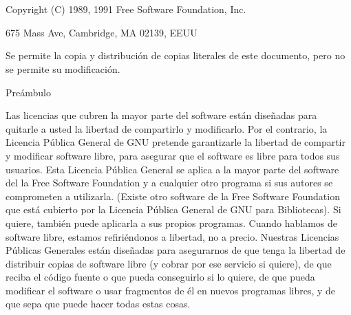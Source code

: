 


\chapter*{}

 \begin{center}

Copyright (C) 1989, 1991 Free Software Foundation, Inc.

675 Mass Ave, Cambridge, MA 02139, EEUU

Se permite la copia y distribución de copias literales de este documento, pero no se permite su modificación.


\end{center}

Preámbulo

Las licencias que cubren la mayor parte del software están diseñadas para quitarle a usted la libertad de compartirlo y modificarlo. Por el contrario, la Licencia Pública General de GNU pretende garantizarle la libertad de compartir y modificar software libre, para asegurar que el software es libre para todos sus usuarios. Esta Licencia Pública General se aplica a la mayor parte del software del la Free Software Foundation y a cualquier otro programa si sus autores se comprometen a utilizarla. (Existe otro software de la Free Software Foundation que está cubierto por la Licencia Pública General de GNU para Bibliotecas). Si quiere, también puede aplicarla a sus propios programas.
Cuando hablamos de software libre, estamos refiriéndonos a libertad, no a precio. Nuestras Licencias Públicas Generales están diseñadas para asegurarnos de que tenga la libertad de distribuir copias de software libre (y cobrar por ese servicio si quiere), de que reciba el código fuente o que pueda conseguirlo si lo quiere, de que pueda modificar el software o usar fragmentos de él en nuevos programas libres, y de que sepa que puede hacer todas estas cosas.

